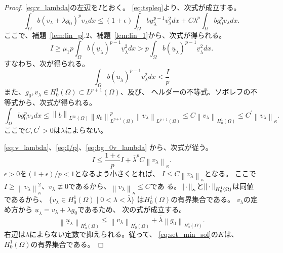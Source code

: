 \begin{proof}
 \eqref{eq:v_lambda}の左辺を$I$とおく。
 \eqref{eq:tspleq}より、次式が成立する。
 \begin{equation}
  \int_\Omega b (v_\lambda + \lambda g_0)^p v_\lambda dx 
   \leq (1 + \epsilon) \int_\Omega b \underline{u}_\lambda ^{p-1}
   v_\lambda^2 dx + C \lambda^p \int_\Omega bg_0^p v_\lambda dx.
   \label{eq:v_lambda_I}
 \end{equation}
 ここで、補題~\ref{lem:lin_p}.2、補題~\ref{lem:lin_1}から、次式が得られる。
 \[
  I \geq \mu_1 p \int_\Omega b (\underline{u}_\lambda)^{p-1}
 \underline{v}_\lambda^2 dx > p \int_\Omega b (\underline{u}_\lambda)^{p-1}
 \underline{v}_\lambda^2 dx.
 \]
 すなわち、次が得られる。
 \begin{equation}
  \int_\Omega b(\underline{u}_\lambda)^{p-1} v_\lambda^2 dx <
   \frac{I}{p} \label{eq:I/p}
 \end{equation}
 また、$g_0, v_\lambda \in H_0^1(\Omega) \subset L^{p+1}(\Omega)$、及び、
 ヘルダーの不等式、ソボレフの不等式から、次式が得られる。
 \begin{equation}
  \int_\Omega b g_0^p v_\lambda dx \leq 
   \left\| b  \right\|_{L^\infty(\Omega)}
   \left\| g_0 \right\|_{L^{p+1}(\Omega)}^p 
   \left\| v_\lambda \right\|_{L^{p+1}(\Omega)}
   \leq C \left\| v_\lambda \right\|_{H_0^1(\Omega)}
   \leq C^\prime \left\| v_\lambda \right\|_{\kappa}.
   \label{eq:bg_0v_lambda}
 \end{equation}
 ここで$C, C^\prime > 0$は$\lambda$によらない。

 \eqref{eq:v_lambda}、\eqref{eq:I/p}、\eqref{eq:bg_0v_lambda}
 から、次式が従う。
 \[
  I \leq \frac{1 + \epsilon}{p} I + \bar{\lambda}^p C \left\|
 v_\lambda \right\|_{\kappa}.
 \]
 $\epsilon > 0$を$(1+\epsilon)/p < 1$となるよう小さくとれば、
 $I \leq C \left\| v_\lambda \right\|_\kappa$となる。
 ここで$I \geq \left\| v_\lambda \right\|_\kappa^2$、$v_\lambda \not
 \equiv 0$であるから、$\left\| v_\lambda \right\|_{\kappa} \leq C$であ
 る。$\left\|\, \cdot \, \right\|_\kappa$と$\left\|\, \cdot \, \right\|_{H_0^1(\Omega)}$は同値であるから、
 $\{ v_\lambda \in H_0^1(\Omega) \mid 0 < \lambda < \bar{\lambda} \}$
 は$H_0^1(\Omega)$の有界集合である。
 $v_\lambda$の定め方から
 $\underline{u}_\lambda = v_\lambda + \lambda g_0$であるため、
 次の式が成立する。
 \[
  \left\| \underline{u}_\lambda \right\|_{H_0^1(\Omega)} 
 \leq \left\| v_\lambda \right\|_{H_0^1(\Omega)}
 + \bar{\lambda} \left\| g_0 \right\|_{H_0^1(\Omega)}.
 \]
 右辺は$\lambda$によらない定数で抑えられる。従って、
 \eqref{eq:set_min_sol}の$K$は、$H_0^1(\Omega)$の有界集合である。\qedhere
\end{proof}

